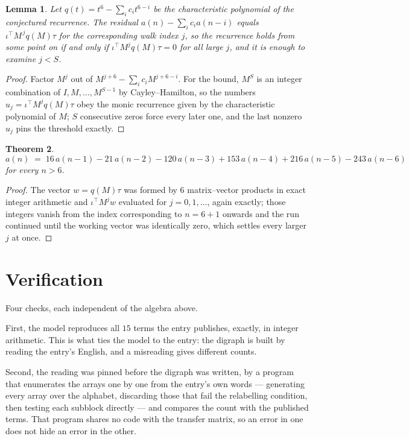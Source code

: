 \documentclass[11pt,a4paper]{article}
\theoremstyle{plain}
\newtheorem{theorem}{Theorem}
\newtheorem{lemma}[theorem]{Lemma}
\theoremstyle{definition}
\begin{document}
\begin{lemma}\label{lem:crit}
Let $q(t)=t^{6}-\sum_i c_it^{6-i}$ be the characteristic polynomial of the
conjectured recurrence. The residual $a(n)-\sum_ic_ia(n-i)$ equals
$\iota^{\!\top}M^{\,j}q(M)\tau$ for the corresponding walk index $j$, so the recurrence
holds from some point on if and only if $\iota^{\!\top}M^{j}q(M)\tau=0$ for all large $j$,
and it is enough to examine $j<S$.
\end{lemma}

\begin{proof}
Factor $M^{j}$ out of $M^{j+6}-\sum_ic_iM^{j+6-i}$. For the bound, $M^{S}$
is an integer combination of $I,M,\dots,M^{S-1}$ by Cayley--Hamilton, so the numbers
$u_j=\iota^{\!\top}M^{j}q(M)\tau$ obey the monic recurrence given by the characteristic
polynomial of $M$; $S$ consecutive zeros force every later one, and the last nonzero $u_j$
pins the threshold exactly.
\end{proof}

\begin{theorem}
\[
a(n)\;=\;16\,a(n-1) - 21\,a(n-2) - 120\,a(n-3) + 153\,a(n-4) + 216\,a(n-5) - 243\,a(n-6)
\]
for every $n>6$.
\end{theorem}

\begin{proof}
The vector $w=q(M)\tau$ was formed by $6$ matrix--vector products in exact integer
arithmetic and $\iota^{\!\top}M^{j}w$ evaluated for $j=0,1,\dots$, again exactly; those
integers vanish from the index corresponding to $n=6+1$ onwards and the run continued
until the working vector was identically zero, which settles every larger $j$ at once.
\end{proof}

\section{Verification}

Four checks, each independent of the algebra above.

First, the model reproduces all $15$ terms the entry publishes, exactly, in integer
arithmetic. This is what ties the model to the entry: the digraph is built by reading the
entry's English, and a misreading gives different counts.

Second, the reading was pinned before the digraph was written, by a program that enumerates
the arrays one by one from the entry's own words --- generating every array over the
alphabet, discarding those that fail the relabelling condition, then testing each subblock
directly --- and compares the count with the published terms. That program shares no code
with the transfer matrix, so an error in one does not hide an error in the other.
\end{document}
